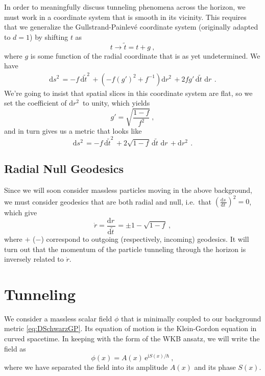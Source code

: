 \documentclass[a4paper,11pt]{article}
\newcommand{\ii}{\text{i}}
\newcommand{\dd}[1]{\text{d}#1 \, }
\newcommand{\e}[1]{\text{e}^{#1}}
\begin{document}
In order to meaningfully discuss tunneling phenomena across the horizon, we must work in a coordinate system that is smooth in its vicinity. This requires that we generalize the Gullstrand-Painlev\'e coordinate system (originally adapted to $d=1$) by shifting $t$ as
\begin{equation}
t \rightarrow \widetilde{t} = t + g \ ,
\end{equation}
where $g$ is some function of the radial coordinate that is as yet undetermined. We have
\begin{align}
\dd{s^2} = -f \, \dd{\widetilde{t}^2} + \left( -f \left( g' \right)^2 + f^{-1} \right) \dd{r^2} + 2 f g' \, \dd{\widetilde{t}} \, \dd{r} \ .
\end{align}
We're going to insist that spatial slices in this coordinate system are flat, so we set the coefficient of $\dd{r^2}$ to unity, which yields
\begin{equation}
g' = \sqrt{\frac{1-f}{f^2}} \ ,
\end{equation}
and in turn gives us a metric that looks like
\begin{equation}
\label{eq:DSchwarzGP}
\dd{s^2} = -f \,\dd{\widetilde{t}^2} + 2 \sqrt{1-f} \, \dd{\widetilde{t}} \, \dd{r} + \dd{r^2} \ .
\end{equation}

\subsection{Radial Null Geodesics}
\label{sec:RadNull}
Since we will soon consider massless particles moving in the above background, we must consider geodesics that are both radial and null, i.e.~that $\left(\frac{\dd{s}}{\dd{t}}\right)^2 = 0$, which give
\begin{equation}
\label{eq:RadialNull}
\dot{r} = \frac{\dd{r}}{\dd{\widetilde{t}}} = \pm 1 - \sqrt{1-f} \ ,
\end{equation}
where $+$ ($-$) correspond to outgoing (respectively, incoming) geodesics. It will turn out that the momentum of the particle tunneling through the horizon is inversely related to $\dot{r}$.

\section{Tunneling}
\label{sec:Tunnel}
We consider a massless scalar field $\phi$ that is minimally coupled to our background metric \eqref{eq:DSchwarzGP}. Its equation of motion is the Klein-Gordon equation in curved spacetime. In keeping with the form of the WKB ansatz, we will write the field as
\begin{equation}
\label{eq:AnsatzWKBI}
\phi(x) = A(x) \, \e{\ii S(x)/\hbar} \ ,
\end{equation}
where we have separated the field into its amplitude $A(x)$ and its phase $S(x)$.
\end{document}
